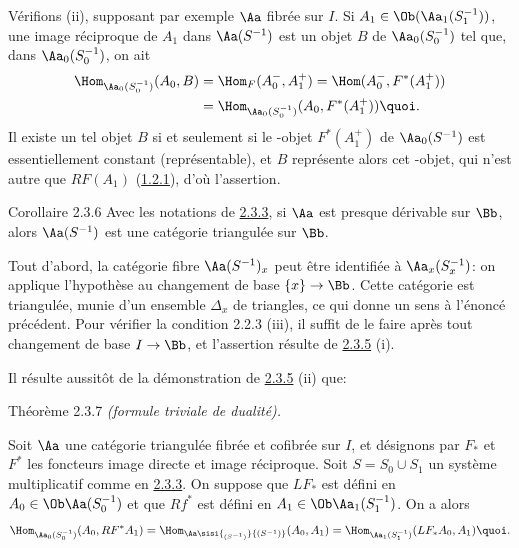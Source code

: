 \documentclass[10pt]{../fichiers-configuration-latex/smfart}
\begin{document}
Vérifions (ii), supposant par exemple $\Aa$ fibrée sur $I$. Si
$A_1\in \Ob (\Aa_1(S^{-1}_1))$, une image réciproque de $A_1$
dans $\Aa(S^{-1})$ est un objet $B$ de
$\Aa_0(S^{-1}_0)$ tel que, dans $\Aa_0(S^{-1}_0)$, on
ait
\begin{align*}
\Hom_{\Aa_0(S^{-1}_0)}(A_0,B) & =\Hom_F(A^{-}_0,
A^{+}_1)=\Hom(A^{-}_0,
F^{\ast}(A^{+}_1))\\
&=\Hom_{\Aa_0(S^{-1}_0)}
(A_0,F^{\ast}(A^{+}_1)){\quoi}.
\end{align*}
Il existe un tel objet $B$ si et seulement si le \iInd-objet
$F^{\ast}(A^{+}_1)$ de $\Aa_0(S^{-1})$ est essentiellement
constant (\ie représentable), et $B$ représente alors cet \iind-objet,
qui n'est autre que $RF(A_1)$ (\hyperref[XVII.def1.2.1]{1.2.1}), d'où l'assertion.

\begin{enonce*}{Corollaire 2.3.6}
Avec les notations de \hyperref[XVII.def2.3.3]{2.3.3}, si $\Aa$ est presque dérivable
sur $\Bb$, alors $\Aa(S^{-1})$ est une catégorie
triangulée sur $\Bb$.
\end{enonce*}


Tout d'abord, la catégorie fibre $\Aa(S^{-1})_x$ peut être
identifiée à $\Aa_x(S^{-1}_x)$: on applique l'hypothèse au
changement de base $\{x\}\rightarrow \Bb$. Cette\pageoriginale
catégorie est triangulée, munie d'un ensemble $\Delta_x$ de triangles,
ce qui donne un sens à l'énoncé précédent. Pour vérifier la condition
2.2.3 (iii), il suffit de le faire après tout changement de base
$I\rightarrow \Bb$, et l'assertion résulte de \hyperref[XVII.prop2.3.5]{2.3.5} (i).

Il résulte aussitôt de la démonstration de \hyperref[XVII.prop2.3.5]{2.3.5} (ii) que:

\begin{enonce*}{Théorème 2.3.7}
\emph{(formule triviale de dualité).}

Soit $\Aa$ une catégorie triangulée fibrée et cofibrée sur
$I$, et désignons par $F_{\ast}$ et $F^{\ast}$ les foncteurs image
directe et image réciproque. Soit $S=S_0\cup S_1$ un système
multiplicatif comme en \hyperref[XVII.def2.3.3]{2.3.3}. On suppose que $LF_{\ast}$ est défini
en $A_0\in \Ob \Aa(S^{-1}_0)$ et que $Rf^{\ast}$ est défini en
$A_1\in \Ob\Aa_1(S^{-1}_1)$. On a alors
\[
\Hom_{\Aa_0(S^{-1}_0)}(A_0,RF^{\ast}A_1)=\Hom_{\Aa\sisi{_{(S^{-1})}}{(S^{-1})}}(A_0,A_1)=\Hom_{\Aa_1(S^{-1}_1)}(LF_{\ast}A_0,A_1){\quoi}.
\]
\end{enonce*}
\end{document}
